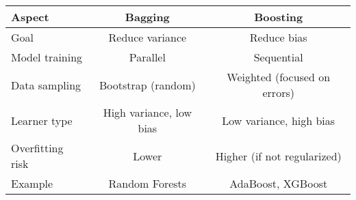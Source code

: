 \documentclass[9pt]{extarticle}
\begin{document}
\begin{table}[H]
\centering
\begin{tabular}{|l|c|c|}
\hline
\textbf{Aspect} & \textbf{Bagging} & \textbf{Boosting} \\
\hline
Goal & Reduce variance & Reduce bias \\
Model training & Parallel & Sequential \\
Data sampling & Bootstrap (random) & Weighted (focused on errors) \\
Learner type & High variance, low bias & Low variance, high bias \\
Overfitting risk & Lower & Higher (if not regularized) \\
Example & Random Forests & AdaBoost, XGBoost \\
\hline
\end{tabular}
\end{table}
\end{document}
